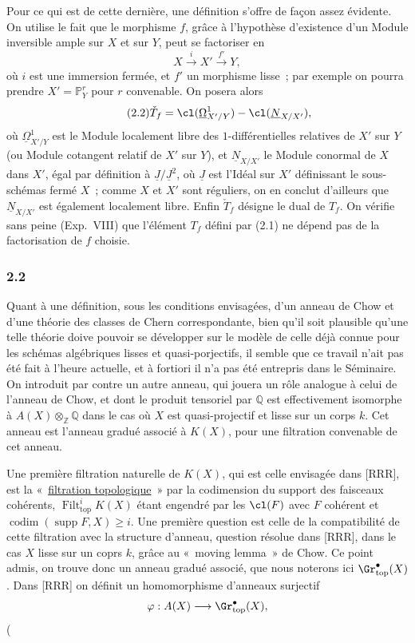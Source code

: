 Pour ce qui est de cette dernière, une définition s'offre de façon assez évidente. On utilise le fait que le morphisme $f$, grâce à l'hypothèse d'existence d'un Module inversible ample sur $X$ et sur $Y$, peut se factoriser en
\begin{equation}\tag{2.1}
X\xrightarrow{i}X'\xrightarrow{f'}Y,
\end{equation}
où $i$ est une immersion fermée, et $f'$ un morphisme lisse~; par exemple on pourra prendre $X'=\mathbb P^r_Y$ pour $r$ convenable. On posera alors
\begin{equation}\tag{2.2}
\check T_f=\cl({\underline\Omega}^1_{X'/Y})-\cl({\underline N}_{X/X'}),
\end{equation}
où ${\underline\Omega}^1_{X'/Y}$ est le Module localement libre des $1$-différentielles relatives de $X'$ sur $Y$ (ou Module cotangent relatif de $X'$ sur $Y$), et ${\underline N}_{X/X'}$ le Module conormal de $X$ dans $X'$, égal par définition à ${\underline J}/{\underline J}^2$, où ${\underline J}$ est l'Idéal sur $X'$ définissant le sous-schémas fermé $X$~; comme $X$ et $X'$ sont réguliers, on en conclut d'ailleurs que ${\underline N}_{X/X'}$ est également localement libre. Enfin $\check T_f$ désigne le dual de $T_f$. On vérifie sans peine (Exp.\ VIII) que l'élément $T_f$ défini par (2.1) ne dépend pas de la factorisation de $f$ choisie.

\subsubsection*{2.2}
Quant à une définition, sous les conditions envisagées, d'un anneau de Chow et d'une théorie des classes de Chern correspondante, bien qu'il soit plausible qu'une telle théorie doive pouvoir se développer sur le modèle de celle déjà connue pour les schémas algébriques lisses et quasi-porjectifs, il semble que ce travail n'ait pas été fait à l'heure actuelle, et à fortiori il n'a pas été entrepris dans le Séminaire. On introduit par contre un autre anneau, qui jouera un rôle analogue à celui de l'anneau de Chow, et dont le produit tensoriel par $\mathbb Q$ est effectivement isomorphe à $A(X)\otimes_{\mathbb Z}\mathbb Q$ dans le cas où $X$ est quasi-projectif et lisse sur un corps $k$. Cet anneau est l'anneau gradué associé à $K(X)$, pour une filtration convenable de cet anneau.

Une première filtration naturelle de $K(X)$, qui est celle envisagée dans [RRR], est la «~\underline{filtration topologique}~» par la codimension du support des faisceaux cohérents, $\operatorname{Filt}^{i}_{\mathrm{top}}K(X)$ étant engendré par les $\cl(F)$ avec $F$ cohérent et $\operatorname{codim}(\operatorname{supp}F,X)\ge i$. Une première question est celle de la compatibilité de cette filtration avec la structure d'anneau, question résolue dans [RRR], dans le cas $X$ lisse sur un coprs $k$, grâce au «~moving lemma~» de Chow. Ce point admis, on trouve donc un anneau gradué associé, que nous noterons ici $\Gr^{\bullet}_{\mathrm{top}}(X)$. Dans [RRR] on définit un homomorphisme d'anneaux surjectif
\[
\varphi:A(X)\longrightarrow \Gr^{\bullet}_{\mathrm{top}}(X),
\]
(
